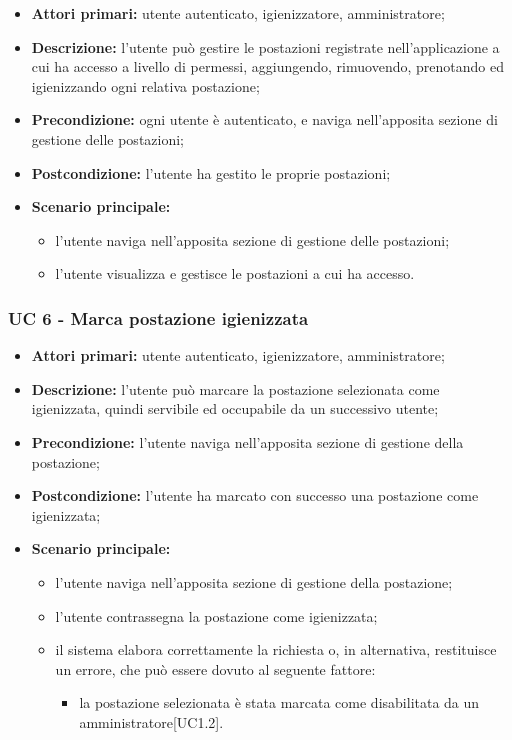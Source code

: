 \begin{itemize}
\item \textbf{Attori primari:} utente autenticato, igienizzatore, amministratore;
\item \textbf{Descrizione:} l’utente può gestire le postazioni registrate nell’applicazione a cui ha accesso a livello di permessi, aggiungendo, rimuovendo, prenotando ed igienizzando ogni relativa postazione;
\item \textbf{Precondizione:} ogni utente è autenticato, e naviga nell’apposita sezione di gestione delle postazioni;
\item \textbf{Postcondizione:} l’utente ha gestito le proprie postazioni;
\item \textbf{Scenario principale:} 
	\begin{itemize}
		\item l’utente naviga nell’apposita sezione di gestione delle postazioni;
		\item l’utente visualizza e gestisce le postazioni a cui ha accesso.
	\end{itemize}
\end{itemize}

\subsubsection{UC 6 - Marca postazione igienizzata}

\begin{itemize}
\item \textbf{Attori primari:} utente autenticato, igienizzatore, amministratore;
\item \textbf{Descrizione:} l’utente può marcare la postazione selezionata come igienizzata, quindi servibile ed occupabile da un successivo utente;
\item \textbf{Precondizione:} l’utente naviga nell’apposita sezione di gestione della postazione; 
\item \textbf{Postcondizione:} l’utente ha marcato con successo una postazione come igienizzata;
\item \textbf{Scenario principale:} 
	\begin{itemize}
		\item l’utente naviga nell’apposita sezione di gestione della postazione;		
		\item l’utente contrassegna la postazione come igienizzata;
		\item il sistema elabora correttamente la richiesta o, in alternativa, restituisce un errore, che può essere dovuto al seguente fattore:
		\begin{itemize}
			\item la postazione selezionata è stata marcata come disabilitata da un amministratore[UC1.2].
		\end{itemize}
	\end{itemize}
\end{itemize}

